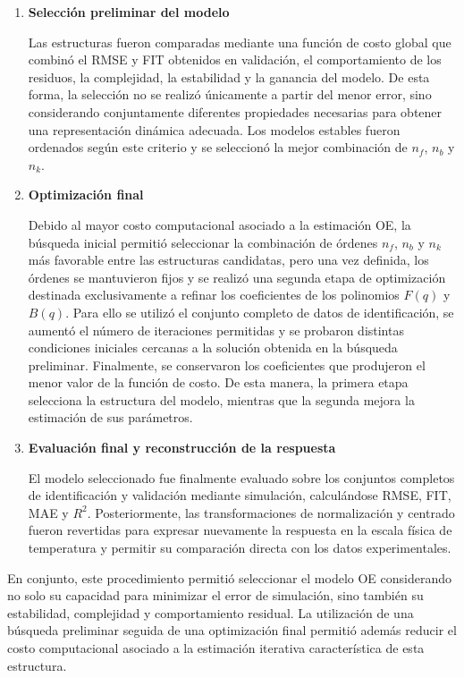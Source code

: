 \documentclass[11pt]{report}
\begin{document}
\begin{enumerate}
\item \textbf{Selección preliminar del modelo}

Las estructuras fueron comparadas mediante una función de costo global que combinó el RMSE y FIT obtenidos en validación, el comportamiento de los residuos, la complejidad, la estabilidad y la ganancia del modelo. De esta forma, la selección no se realizó únicamente a partir del menor error, sino considerando conjuntamente diferentes propiedades necesarias para obtener una representación dinámica adecuada. Los modelos estables fueron ordenados según este criterio y se seleccionó la mejor combinación de $n_f$, $n_b$ y $n_k$.


\item \textbf{Optimización final}


Debido al mayor costo computacional asociado a la estimación OE, la búsqueda inicial permitió seleccionar la combinación de órdenes $n_f$, $n_b$ y $n_k$ más favorable entre las estructuras candidatas, pero una vez definida, los órdenes se mantuvieron fijos y se realizó una segunda etapa de optimización destinada exclusivamente a refinar los coeficientes de los polinomios $F(q)$ y $B(q)$. Para ello se utilizó el conjunto completo de datos de identificación, se aumentó el número de iteraciones permitidas y se probaron distintas condiciones iniciales cercanas a la solución obtenida en la búsqueda preliminar. Finalmente, se conservaron los coeficientes que produjeron el menor valor de la función de costo. De esta manera, la primera etapa selecciona la estructura del modelo, mientras que la segunda mejora la estimación de sus parámetros.


\item \textbf{Evaluación final y reconstrucción de la respuesta}

El modelo seleccionado fue finalmente evaluado sobre los conjuntos completos de identificación y validación mediante simulación, calculándose RMSE, FIT, MAE y $R^2$. Posteriormente, las transformaciones de normalización y centrado fueron revertidas para expresar nuevamente la respuesta en la escala física de temperatura y permitir su comparación directa con los datos experimentales.

\end{enumerate}


En conjunto, este procedimiento permitió seleccionar el modelo OE considerando no solo su capacidad para minimizar el error de simulación, sino también su estabilidad, complejidad y comportamiento residual. La utilización de una búsqueda preliminar seguida de una optimización final permitió además reducir el costo computacional asociado a la estimación iterativa característica de esta estructura.
\end{document}
